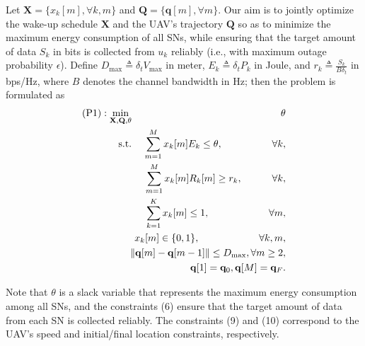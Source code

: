 \documentclass[journal]{IEEEtran}
\newcommand{\norm}[1]{\left\lVert#1\right\rVert}
\begin{document}
Let $\mathbf{X}=\{x_k[m], \forall k,m\}$ and $\mathbf{Q}=\{\mathbf{q}[m], \forall m\}$. Our aim is to jointly optimize the wake-up schedule $\mathbf{X}$ and the UAV's trajectory $\mathbf{Q}$ so as to minimize the maximum energy consumption of all SNs, while ensuring that the target amount of data $S_k$ in bits is collected from $u_k$ reliably (i.e., with maximum outage probability $\epsilon$). Define $D_{\max}\triangleq \delta_t V_{\max}$ in meter, $E_k\triangleq \delta_t P_k$ in Joule, and $r_k\triangleq \frac{S_k}{B\delta_t}$ in bps/Hz, where $B$ denotes the channel bandwidth in Hz; then the problem is formulated as
\begin{eqnarray}
\text{(P1)}: \min\limits_{\mathbf{X},\mathbf{Q},\theta} &&\hspace{-4mm} \theta\nonumber\\
\text{s.t.} &&\hspace{-4mm} \sum_{m=1}^{M}x_{k}[m]E_k\leq \theta, \quad\quad\quad\quad\quad\forall k,\\
&&\hspace{-4mm} \sum_{m=1}^{M}x_{k}[m] R_{k}[m]\geq r_k, \quad\quad\quad \forall k,\\
&&\hspace{-4mm} \sum_{k=1}^{K}x_{k}[m]\leq 1, \quad\quad\quad\quad\quad\quad \forall m,\\
&&\hspace{-4mm} x_{k}[m]\in \{0,1\}, \quad\quad\quad\quad\quad\quad \forall k,m, \\
&&\hspace{-4mm} \norm{\mathbf{q}[m]-\mathbf{q}[m-1]}\leq D_{\max}, \forall m\geq 2,\\
&&\hspace{-4mm} \mathbf{q}[1]=\mathbf{q}_0,\mathbf{q}[M]=\mathbf{q}_F.
\end{eqnarray}

Note that $\theta$ is a slack variable that represents the maximum energy consumption among all SNs, and the constraints (6) ensure that the target amount of data from each SN is collected reliably. The constraints (9) and (10) correspond to the UAV's speed and
initial/final location constraints, respectively.
\end{document}
